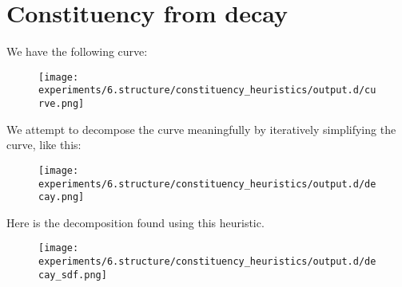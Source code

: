 \section{Constituency from decay}

We have the following curve:

\begin{figure}
\texttt{[image: experiments/6.structure/constituency\_heuristics/output.d/curve.png]}
\end{figure}

We attempt to decompose the curve meaningfully by iteratively
simplifying the curve, like this:

\begin{figure}
\texttt{[image: experiments/6.structure/constituency\_heuristics/output.d/decay.png]}
\end{figure}

Here is the decomposition found using this heuristic.

\begin{figure}
\texttt{[image: experiments/6.structure/constituency\_heuristics/output.d/decay\_sdf.png]}
\end{figure}
